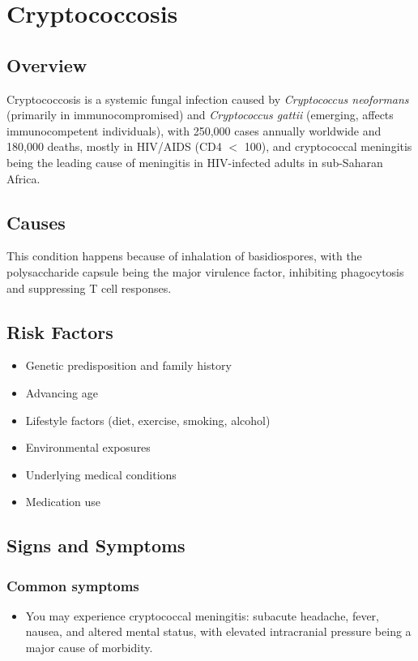 \chapter{Cryptococcosis}
\label{sec:Cryptococcosis}

\section{Overview}
Cryptococcosis is a systemic fungal infection caused by \textit{Cryptococcus neoformans} (primarily in immunocompromised) and \textit{Cryptococcus gattii} (emerging, affects immunocompetent individuals), with 250,000 cases annually worldwide and 180,000 deaths, mostly in HIV/AIDS (CD4 $<$ 100), and cryptococcal meningitis being the leading cause of meningitis in HIV-infected adults in sub-Saharan Africa.
\section{Causes}
This condition happens because of inhalation of basidiospores, with the polysaccharide capsule being the major virulence factor, inhibiting phagocytosis and suppressing T cell responses.     
\section{Risk Factors}

\begin{itemize}[noitemsep]
  \item Genetic predisposition and family history
  \item Advancing age
  \item Lifestyle factors (diet, exercise, smoking, alcohol)
  \item Environmental exposures
  \item Underlying medical conditions
  \item Medication use
\end{itemize}
\section{Signs and Symptoms}

\subsection{Common symptoms}
\begin{itemize}[noitemsep]
  \item You may experience cryptococcal meningitis: subacute headache, fever, nausea, and altered mental status, with elevated intracranial pressure being a major cause of morbidity. 
  \end{itemize}

